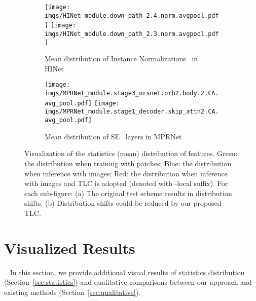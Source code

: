 \documentclass[runningheads]{llncs}
\begin{document}
\renewcommand\thesubfigure{\roman{subfigure}}
\begin{figure}[t]
     \centering
     \begin{subfigure}[b]{\textwidth}
         \centering
\texttt{[image: imgs/HINet\_module.down\_path\_2.4.norm.avgpool.pdf]}
\texttt{[image: imgs/HINet\_module.down\_path\_2.3.norm.avgpool.pdf]}

         \caption{Mean distribution of Instance Normalizations~\cite{ulyanov2016instance} in HINet~\cite{chen2021hinet}}
         \label{fig:HINet_distribution_more}
     \end{subfigure}
     \hfill
     \begin{subfigure}[b]{\textwidth}
         \centering
         \texttt{[image: imgs/MPRNet\_module.stage3\_orsnet.orb2.body.2.CA.avg\_pool.pdf]}
\texttt{[image: imgs/MPRNet\_module.stage1\_decoder.skip\_attn2.CA.avg\_pool.pdf]}

         \caption{Mean distribution of SE~\cite{hu2018squeeze} layers in MPRNet~\cite{Zamir2021MPRNet}}
         \label{fig:MPRNet_distribution_more}
     \end{subfigure}
        \caption{Visualization of the statistics (mean) distribution of features.
Green: the distribution when training with patches; Blue: the distribution when inference with images; Red: the distribution when inference with images and TLC is adopted (denoted with -local suffix). 
For each sub-figure:  (a) The original test scheme results in distribution shifts. (b) Distribution shifts could be reduced by our proposed TLC.}
        \label{fig:distribution_more}
\end{figure}

\section{Visualized Results} ~\label{sec:visulized}
In this section, we provide additional visual results of statistics distribution (Section~\ref{sec:statistics}) and qualitative comparisons between our approach and existing methods (Section~\ref{sec:qualitative}).
\end{document}
